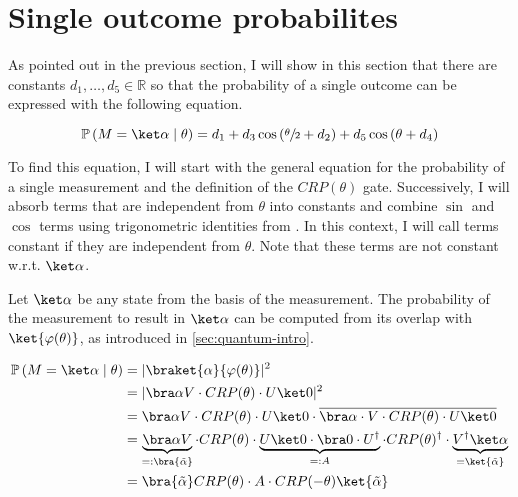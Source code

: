 \section{Single outcome probabilites}
\label{sec:single-outcome-probability}

As pointed out in the previous section, I will show in this section that there
are constants $d_1, \dots, d_5 \in \mathbb R$ so that the probability of a
single outcome can be expressed with the following equation.

\begin{equation}
    \mathbb P\left(M = \ket \alpha \mid \theta\right)
        = d_1 + d_3 \cos\left(\sfrac\theta2 + d_2\right) + d_5 \cos\left(\theta + d_4\right)
\end{equation}

To find this equation, I will start with the general equation for the
probability of a single measurement and the definition of the $CRP(\theta)$
gate. 
Successively, I will absorb terms that are independent from $\theta$ into
constants and combine $\sin$ and $\cos$ terms using trigonometric identities
from \cite{bronstejn_taschenbuch_2016}.
In this context, I will call terms constant if they are independent from
$\theta$.
Note that these terms are not constant w.r.t. $\ket\alpha$.

Let $\ket\alpha$ be any state from the basis of the measurement.
The probability of the measurement to result in $\ket\alpha$ can be computed
from its overlap with $\ket{\varphi(\theta)}$, as introduced in
\autoref{sec:quantum-intro}.

\begin{equation}
    \label{eq:single-outcome-prob}
    \begin{split}
        \mathbb P\left(M = \ket\alpha \mid \theta\right)
            &= \lvert\braket{\alpha}{\varphi(\theta)}\rvert^2\\
            &= \lvert \bra\alpha V \cdot CRP(\theta) \cdot U \ket0 \rvert^2 \\
            &= \bra\alpha V \cdot CRP(\theta) \cdot U \ket0
                \cdot \overline{\bra\alpha \cdot V \cdot CRP(\theta) \cdot U \ket0} \\
            &= \underbrace{\bra\alpha V}_{=: \bra{\tilde\alpha}} \cdot CRP(\theta)
                \cdot \underbrace{U \ket0 \cdot \bra0 \cdot U^\dagger}_{=: A} \cdot CRP(\theta)^\dagger
                \cdot \underbrace{V^\dagger \ket\alpha}_{=\ket{\tilde\alpha}} \\
            &= \bra{\tilde\alpha} CRP(\theta) \cdot A \cdot CRP(-\theta) \ket{\tilde\alpha}
    \end{split}
\end{equation}

